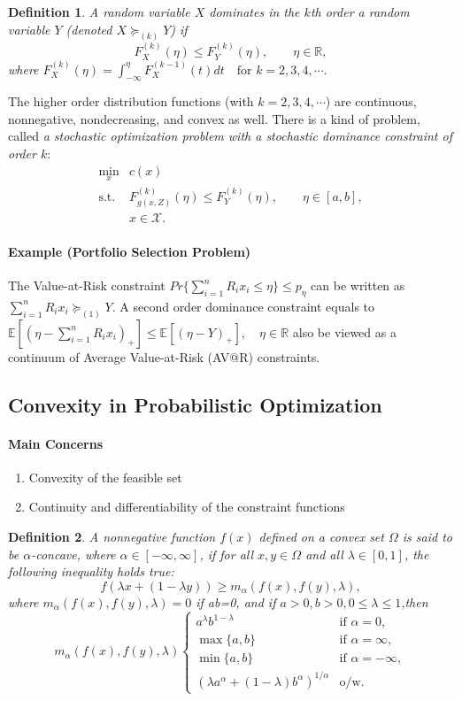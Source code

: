 \documentclass[a4pper,11pt]{article}
\newtheorem{defn}{Definition}[section]
\begin{document}
\begin{defn}
    A random variable $X$ dominates in the $k$th order a random variable $Y$ (denoted $X\succeq_{(k)} Y$) if 
    $$F_X^{(k)}(\eta)\leq F_Y^{(k)}(\eta), \qquad \eta \in \mathbb R,$$
    where $F_X^{(k)}(\eta) =\int^\eta_{-\infty} F_X^{(k-1)}(t)dt\quad \text{for }k=2,3,4,\cdots .$
\end{defn}
The higher order distribution functions (with $k=2,3,4,\cdots$) are continuous, nonnegative, nondecreasing, and convex as well.
There is a kind of problem, called \textit{a stochastic optimization problem with a stochastic dominance constraint of order $k$}:
\begin{equation}
    \label{4.1}
    \begin{array}{ll}
        \min_x   & c(x) \\
        \text{s.t.} & F^{(k)}_{g(x,Z)}(\eta)\leq F^{(k)}_{Y}(\eta),\qquad \eta\in  [a,b],\\
        & x\in \mathcal X.
    \end{array}
\end{equation}
\paragraph{Example (Portfolio Selection Problem)} The Value-at-Risk constraint $Pr\{\sum_{i=1}^n R_ix_i\leq \eta\}\leq p_\eta$ can be written as $\sum_{i=1}^n R_ix_i\succeq_{(1)}Y$. A second order dominance constraint equals to $\mathbb E[(\eta-\sum_{i=1}^n R_ix_i)_+]\leq \mathbb E[(\eta-Y)_+], \quad \eta\in \mathbb R$ also be viewed as a continuum of Average Value-at-Risk (AV@R) constraints.

\subsection{Convexity in Probabilistic Optimization}
\paragraph{Main Concerns}
\begin{enumerate}
\item Convexity of the feasible set
\item Continuity and differentiability of the constraint functions
\end{enumerate}
\begin{defn}
A nonnegative function $f(x)$ defined on a convex set $\Omega$ is said to be $\alpha$-concave, where $\alpha \in[-\infty,\infty]$, if for all $x,y\in \Omega$ and all $\lambda\in[0,1]$, the following inequality holds true:
$$f(\lambda x+(1-\lambda y))\geq m_\alpha (f(x),f(y),\lambda),$$
where $m_\alpha (f(x),f(y),\lambda)=0$ if ab=0, and if $a>0,b>0, 0\leq \lambda \leq 1$,then 
$$
m_\alpha (f(x),f(y),\lambda)\begin{cases}
a^\lambda b^{1-\lambda} & \text{if } \alpha=0,\\
\max\{a,b\} & \text{if } \alpha=\infty,\\
\min\{a,b\} & \text{if } \alpha=-\infty,\\
(\lambda a^\alpha+(1-\lambda) b^\alpha)^{1/\alpha}&\text{o/w}.
\end{cases}
$$
\end{defn}
\end{document}
